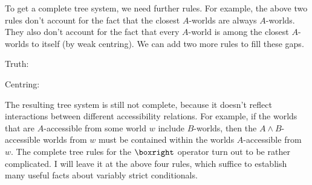 To get a complete tree system, we need further rules. For example, the above two
rules don't account for the fact that the closest $A$-worlds are always
$A$-worlds. They also don't account for the fact that every $A$-world is among
the closest $A$-worlds to itself (by weak centring). We can add two more rules
to fill these gaps.

\bigskip
\begin{center}
  \begin{minipage}[t]{0.4\textwidth} \centering
    \hspace{-10mm}Truth:
    \medskip
    
\end{minipage}
\begin{minipage}[t]{0.4\textwidth} \centering
  \hspace{-10mm}Centring:
    \medskip
  
\end{minipage}
\end{center}
\bigskip

The resulting tree system is still not complete, because it doesn't reflect
interactions between different accessibility relations. For example, if the
worlds that are $A$-accessible from some world $w$ include $B$-worlds, then the
$A\land B$-accessible worlds from $w$ must be contained within the worlds
$A$-accessible from $w$. The complete tree rules for the $\boxright$ operator
turn out to be rather complicated. I will leave it at the above four rules,
which suffice to establish many useful facts about variably strict conditionals.


